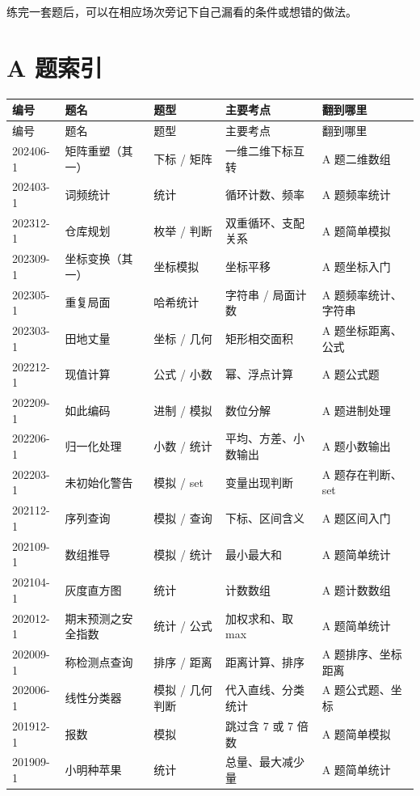 练完一套题后，可以在相应场次旁记下自己漏看的条件或想错的做法。

\section{A 题索引}

\begingroup
\small
\setlength{\tabcolsep}{3pt}
\begin{longtable}{p{1.8cm}p{2.8cm}p{2.6cm}p{3.5cm}p{3.5cm}}
\toprule
编号 & 题名 & 题型 & 主要考点 & 翻到哪里 \\
\midrule
\endfirsthead
\toprule
编号 & 题名 & 题型 & 主要考点 & 翻到哪里 \\
\midrule
\endhead
202406-1 & 矩阵重塑（其一） & 下标 / 矩阵 & 一维二维下标互转 & A 题二维数组 \\
202403-1 & 词频统计 & 统计 & 循环计数、频率 & A 题频率统计 \\
202312-1 & 仓库规划 & 枚举 / 判断 & 双重循环、支配关系 & A 题简单模拟 \\
202309-1 & 坐标变换（其一） & 坐标模拟 & 坐标平移 & A 题坐标入门 \\
202305-1 & 重复局面 & 哈希统计 & 字符串 / 局面计数 & A 题频率统计、字符串 \\
202303-1 & 田地丈量 & 坐标 / 几何 & 矩形相交面积 & A 题坐标距离、公式 \\
202212-1 & 现值计算 & 公式 / 小数 & 幂、浮点计算 & A 题公式题 \\
202209-1 & 如此编码 & 进制 / 模拟 & 数位分解 & A 题进制处理 \\
202206-1 & 归一化处理 & 小数 / 统计 & 平均、方差、小数输出 & A 题小数输出 \\
202203-1 & 未初始化警告 & 模拟 / set & 变量出现判断 & A 题存在判断、set \\
202112-1 & 序列查询 & 模拟 / 查询 & 下标、区间含义 & A 题区间入门 \\
202109-1 & 数组推导 & 模拟 / 统计 & 最小最大和 & A 题简单统计 \\
202104-1 & 灰度直方图 & 统计 & 计数数组 & A 题计数数组 \\
202012-1 & 期末预测之安全指数 & 统计 / 公式 & 加权求和、取 max & A 题简单统计 \\
202009-1 & 称检测点查询 & 排序 / 距离 & 距离计算、排序 & A 题排序、坐标距离 \\
202006-1 & 线性分类器 & 模拟 / 几何判断 & 代入直线、分类统计 & A 题公式题、坐标 \\
201912-1 & 报数 & 模拟 & 跳过含 7 或 7 倍数 & A 题简单模拟 \\
201909-1 & 小明种苹果 & 统计 & 总量、最大减少量 & A 题简单统计 \\

\end{longtable}
